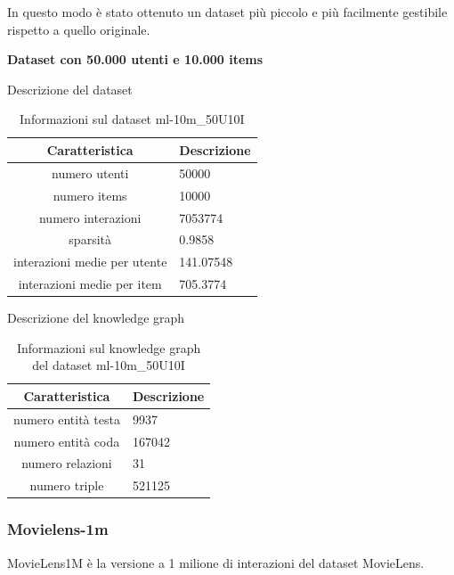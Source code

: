 \noindent In questo modo è stato ottenuto un dataset più piccolo e più facilmente gestibile rispetto a quello originale.

\noindent\textbf{Dataset con 50.000 utenti e 10.000 items}

\noindent Descrizione del dataset
\begin{table}[H]
    \centering
    \footnotesize
    \begin{tabularx}{\textwidth}{|c|X|}
        \hline
        \textbf{Caratteristica} & \textbf{Descrizione} \\
        \hline
        numero utenti & 50000 \\
        \hline
        numero items & 10000 \\
        \hline
        numero interazioni & 7053774 \\
        \hline
        sparsità & 0.9858 \\
        \hline
        interazioni medie per utente & 141.07548 \\
        \hline
        interazioni medie per item & 705.3774 \\
        \hline
    \end{tabularx}
    \caption{Informazioni sul dataset ml-10m\_50U10I}
    \label{tab:dataset_info}
\end{table}


\noindent Descrizione del knowledge graph
\begin{table}[H]
    \centering
    \footnotesize
    \begin{tabularx}{\textwidth}{|c|X|}
        \hline
        \textbf{Caratteristica} & \textbf{Descrizione} \\
        \hline
        numero entità testa & 9937 \\
        \hline
        numero entità coda & 167042 \\
        \hline
        numero relazioni & 31 \\
        \hline
        numero triple & 521125 \\
        \hline
    \end{tabularx}
    \caption{Informazioni sul knowledge graph del dataset ml-10m\_50U10I}
    \label{tab:dataset_info}
\end{table}


\subsubsection{Movielens-1m}

\noindent MovieLens1M è la versione a 1 milione di interazioni del dataset MovieLens.

